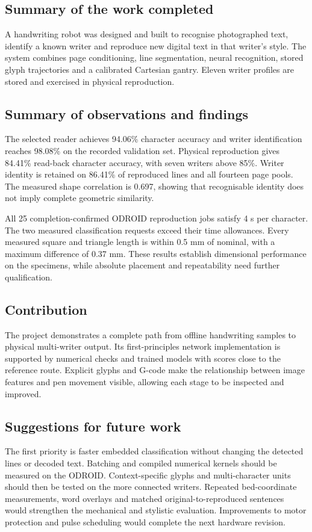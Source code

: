 \subsection{Summary of the work completed}
A handwriting robot was designed and built to recognise photographed text, identify a known writer and reproduce new digital text in that writer's style. The system combines page conditioning, line segmentation, neural recognition, stored glyph trajectories and a calibrated Cartesian gantry. Eleven writer profiles are stored and exercised in physical reproduction.

\subsection{Summary of observations and findings}
The selected reader achieves 94.06\% character accuracy and writer identification reaches 98.08\% on the recorded validation set. Physical reproduction gives 84.41\% read-back character accuracy, with seven writers above 85\%. Writer identity is retained on 86.41\% of reproduced lines and all fourteen page pools. The measured shape correlation is 0.697, showing that recognisable identity does not imply complete geometric similarity.

All 25 completion-confirmed ODROID reproduction jobs satisfy 4 s per character. The two measured classification requests exceed their time allowances. Every measured square and triangle length is within 0.5 mm of nominal, with a maximum difference of 0.37 mm. These results establish dimensional performance on the specimens, while absolute placement and repeatability need further qualification.

\subsection{Contribution}
The project demonstrates a complete path from offline handwriting samples to physical multi-writer output. Its first-principles network implementation is supported by numerical checks and trained models with scores close to the reference route. Explicit glyphs and G-code make the relationship between image features and pen movement visible, allowing each stage to be inspected and improved.

\subsection{Suggestions for future work}
The first priority is faster embedded classification without changing the detected lines or decoded text. Batching and compiled numerical kernels should be measured on the ODROID. Context-specific glyphs and multi-character units should then be tested on the more connected writers. Repeated bed-coordinate measurements, word overlays and matched original-to-reproduced sentences would strengthen the mechanical and stylistic evaluation. Improvements to motor protection and pulse scheduling would complete the next hardware revision.
